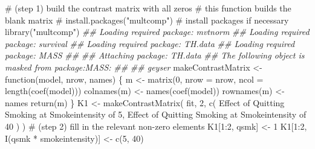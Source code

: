 \documentclass[
  10pt,
  a4paper,
]{book}
\newenvironment{Shaded}{\begin{snugshade}}{\end{snugshade}}
\newcommand{\AttributeTok}[1]{\textcolor[rgb]{0.40,0.45,0.13}{#1}}
\newcommand{\CommentTok}[1]{\textcolor[rgb]{0.37,0.37,0.37}{#1}}
\newcommand{\ControlFlowTok}[1]{\textcolor[rgb]{0.00,0.46,0.62}{#1}}
\newcommand{\DecValTok}[1]{\textcolor[rgb]{0.68,0.00,0.00}{#1}}
\newcommand{\DocumentationTok}[1]{\textcolor[rgb]{0.37,0.37,0.37}{\textit{#1}}}
\newcommand{\FunctionTok}[1]{\textcolor[rgb]{0.28,0.35,0.67}{#1}}
\newcommand{\NormalTok}[1]{\textcolor[rgb]{0.00,0.46,0.62}{#1}}
\newcommand{\OtherTok}[1]{\textcolor[rgb]{0.00,0.46,0.62}{#1}}
\newcommand{\SpecialCharTok}[1]{\textcolor[rgb]{0.37,0.37,0.37}{#1}}
\newcommand{\StringTok}[1]{\textcolor[rgb]{0.13,0.47,0.30}{#1}}
\begin{document}
\begin{Shaded}
\begin{Highlighting}[]
\CommentTok{\# (step 1) build the contrast matrix with all zeros}
\CommentTok{\# this function builds the blank matrix }
\CommentTok{\# install.packages("multcomp") \# install packages if necessary}
\FunctionTok{library}\NormalTok{(}\StringTok{"multcomp"}\NormalTok{)}
\DocumentationTok{\#\# Loading required package: mvtnorm}
\DocumentationTok{\#\# Loading required package: survival}
\DocumentationTok{\#\# Loading required package: TH.data}
\DocumentationTok{\#\# Loading required package: MASS}
\DocumentationTok{\#\# }
\DocumentationTok{\#\# Attaching package: \textquotesingle{}TH.data\textquotesingle{}}
\DocumentationTok{\#\# The following object is masked from \textquotesingle{}package:MASS\textquotesingle{}:}
\DocumentationTok{\#\# }
\DocumentationTok{\#\#     geyser}
\NormalTok{makeContrastMatrix }\OtherTok{\textless{}{-}} \ControlFlowTok{function}\NormalTok{(model, nrow, names) \{}
\NormalTok{  m }\OtherTok{\textless{}{-}} \FunctionTok{matrix}\NormalTok{(}\DecValTok{0}\NormalTok{, }\AttributeTok{nrow =}\NormalTok{ nrow, }\AttributeTok{ncol =} \FunctionTok{length}\NormalTok{(}\FunctionTok{coef}\NormalTok{(model)))}
  \FunctionTok{colnames}\NormalTok{(m) }\OtherTok{\textless{}{-}} \FunctionTok{names}\NormalTok{(}\FunctionTok{coef}\NormalTok{(model))}
  \FunctionTok{rownames}\NormalTok{(m) }\OtherTok{\textless{}{-}}\NormalTok{ names}
  \FunctionTok{return}\NormalTok{(m)}
\NormalTok{\}}
\NormalTok{K1 }\OtherTok{\textless{}{-}}
  \FunctionTok{makeContrastMatrix}\NormalTok{(}
\NormalTok{    fit,}
    \DecValTok{2}\NormalTok{,}
    \FunctionTok{c}\NormalTok{(}
      \StringTok{\textquotesingle{}Effect of Quitting Smoking at Smokeintensity of 5\textquotesingle{}}\NormalTok{,}
      \StringTok{\textquotesingle{}Effect of Quitting Smoking at Smokeintensity of 40\textquotesingle{}}
\NormalTok{    )}
\NormalTok{  )}
\CommentTok{\# (step 2) fill in the relevant non{-}zero elements }
\NormalTok{K1[}\DecValTok{1}\SpecialCharTok{:}\DecValTok{2}\NormalTok{, }\StringTok{\textquotesingle{}qsmk\textquotesingle{}}\NormalTok{] }\OtherTok{\textless{}{-}} \DecValTok{1}
\NormalTok{K1[}\DecValTok{1}\SpecialCharTok{:}\DecValTok{2}\NormalTok{, }\StringTok{\textquotesingle{}I(qsmk * smokeintensity)\textquotesingle{}}\NormalTok{] }\OtherTok{\textless{}{-}} \FunctionTok{c}\NormalTok{(}\DecValTok{5}\NormalTok{, }\DecValTok{40}\NormalTok{)}


\end{Highlighting}
\end{Shaded}
\end{document}
